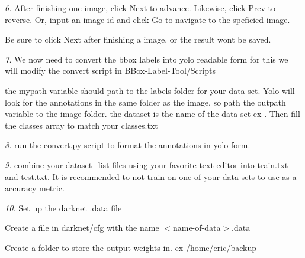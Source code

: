 {\itshape 6.} After finishing one image, click {\ttfamily Next} to advance. Likewise, click {\ttfamily Prev} to reverse. Or, input an image id and click {\ttfamily Go} to navigate to the speficied image.
\begin{DoxyItemize}
\item Be sure to click {\ttfamily Next} after finishing a image, or the result won\textquotesingle{}t be saved.
\end{DoxyItemize}

{\itshape 7.} We now need to convert the bbox labels into yolo readable form for this we will modify the convert script in {\ttfamily B\+Box-\/\+Label-\/\+Tool/\+Scripts}

the {\ttfamily mypath} variable should path to the labels folder for your data set. Yolo will look for the annotations in the same folder as the image, so path the {\ttfamily outpath} variable to the image folder. the dataset is the name of the data set ex {}. Then fill the classes array to match your {\ttfamily classes.\+txt}


\begin{DoxyCode}{0}
\end{DoxyCode}


{\itshape 8.} run the convert.\+py script to format the annotations in yolo form.

{\itshape 9.} combine your dataset\+\_\+list files using your favorite text editor into train.\+txt and test.\+txt. It is recommended to not train on one of your data sets to use as a accuracy metric.

{\itshape 10.} Set up the darknet .data file


\begin{DoxyItemize}
\item Create a file in darknet/cfg with the name $<$name-\/of-\/data$>$.data
\item Create a folder to store the output weights in. ex /home/eric/backup 
\begin{DoxyCode}{0}
\end{DoxyCode}

\end{DoxyItemize}

